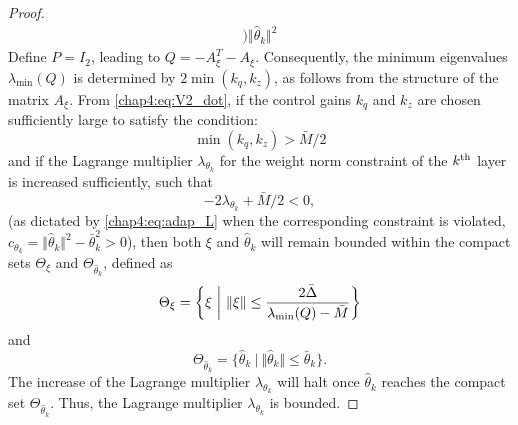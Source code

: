 \begin{proof}
\begin{equation}
\begin{aligned}
        \bigg)
        \Vert\hat\theta_k\Vert^2 
    \end{aligned}
    \label{chap4:eq:V2_dot}
\end{equation}
Define $P=I_2$, leading to $Q = -A_{\xi}^T - A_{\xi}$. 
Consequently, the minimum eigenvalues ${\lambda_{\text{min}}(Q)}$ is determined by $2\min({k_q},{k_z})$, as follows from the structure of the matrix $A_{\xi}$. 
From \eqref{chap4:eq:V2_dot}, if the control gains ${k_q}$ and ${k_z}$ are chosen sufficiently large to satisfy the condition:
\begin{equation}
    \min({k_q},{k_z})>\bar M/2
    \label{chap4:eq:stable_cond}
\end{equation}
and if the Lagrange multiplier $\lambda_{\theta_k}$ for the weight norm constraint of the $k\textsuperscript{th}$ layer is increased sufficiently, such that
\begin{equation}
    -2\lambda_{\theta_k} +{\bar M/ 2}<0,  
\end{equation}
(as dictated by \eqref{chap4:eq:adap_L} when the corresponding constraint is violated, \ie $c_{\theta_k}=\Vert \hat\theta_k\Vert^2 -\bar\theta_k^2 > 0$), then both $\xi$ and $\hat\theta_k$ will remain bounded within the compact sets $\Theta_\xi$ and $\Theta_{\hat\theta_k}$, defined as
\begin{equation}
    \Theta_\xi = 
    \bigg\{ \xi \ \bigg\vert\ \Vert\xi\Vert \le  
    {2\bar \Delta\over \lambda _\text{min}(Q)-\bar M} 
    \bigg\}
\end{equation}
and
\begin{equation}
    \Theta_{\hat\theta_k} = 
    \{
    \hat\theta_k 
    \ 
    \vert
    \ 
    \Vert
    \hat\theta_k\Vert \le  
    \bar\theta_k
    \}
    .
\end{equation}
The increase of the Lagrange multiplier $\lambda_{\theta_k}$ will halt once $\hat \theta_k$ reaches the compact set $\Theta_{\hat\theta_k}$. 
Thus, the Lagrange multiplier $\lambda_{\theta_k}$ is bounded.


\end{proof}
